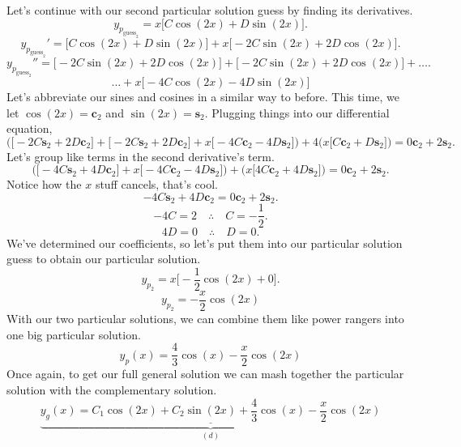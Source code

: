 \documentclass[a4paper,12pt]{article} %
\begin{document}
Let's continue with our second particular solution guess by finding its derivatives.
$$ y_{p_{\text{guess}_2}} = x\bigg[C\cos{(2x)} + D\sin{(2x)}\bigg]. $$
$$ y_{p_{\text{guess}_2}}' = \bigg[C\cos{(2x)} + D\sin{(2x)}\bigg] + x\bigg[-2C\sin{(2x)} + 2D\cos{(2x)}\bigg]. $$
$$ y_{p_{\text{guess}_2}}'' = \bigg[-2C\sin{(2x)} + 2D\cos{(2x)}\bigg] + \bigg[-2C\sin{(2x)} + 2D\cos{(2x)}\bigg] +\ldots. $$
$$ \ldots+x\bigg[-4C\cos{(2x)} - 4D\sin{(2x)}\bigg] $$
Let's abbreviate our sines and cosines in a similar way to before. This time, we let $\cos{(2x)} = \textbf{c}_2$ and $\sin{(2x)} = \textbf{s}_2$. Plugging things into our differential equation,
$$ \bigg(\big[-2C\textbf{s}_2 + 2D\textbf{c}_2\big] + \big[-2C\textbf{s}_2 + 2D\textbf{c}_2\big] + x\big[-4C\textbf{c}_2 - 4D\textbf{s}_2\big]  \bigg) + 4\bigg(x\big[C\textbf{c}_2 + D\textbf{s}_2\big]\bigg) = 0\textbf{c}_2 + 2\textbf{s}_2. $$
Let's group like terms in the second derivative's term.
$$ \bigg(\big[-4C\textbf{s}_2 + 4D\textbf{c}_2\big] + x\big[-4C\textbf{c}_2 - 4D\textbf{s}_2\big]\bigg) + \bigg(x\big[4C\textbf{c}_2 + 4D\textbf{s}_2\big]\bigg) = 0\textbf{c}_2 + 2\textbf{s}_2 .$$
Notice how the $x$ stuff cancels, that's cool.
$$ -4C\textbf{s}_2 + 4D\textbf{c}_2 = 0\textbf{c}_2 + 2\textbf{s}_2. $$
$$ -4C = 2 \quad\therefore\quad C = -\frac{1}{2}. $$
$$ 4D = 0 \quad\therefore\quad D = 0. $$
We've determined our coefficients, so let's put them into our particular solution guess to obtain our particular solution.
$$ y_{p_2} = x\bigg[-\frac{1}{2}\cos{(2x)} + 0\bigg]. $$
$$ \boxed{y_{p_2} = -\frac{x}{2}\cos{(2x)}} $$
With our two particular solutions, we can combine them like power rangers into one big particular solution.
$$ \boxed{y_p(x) = \frac{4}{3}\cos{(x)} - \frac{x}{2}\cos{(2x)}} $$
Once again, to get our full general solution we can mash together the particular solution with the complementary solution.
$$ \underbrace{\underline{\boxed{y_g(x) = C_1\cos{(2x)} + C_{2}\sin{(2x)} + \frac{4}{3}\cos{(x)} - \frac{x}{2}\cos{(2x)}}}}_{(d)}$$
\end{document}
